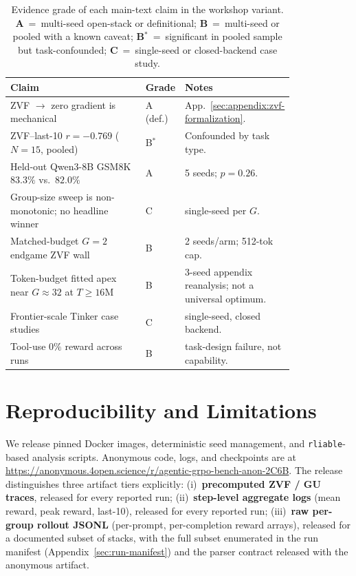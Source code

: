 \documentclass{article}
\begin{document}
\begin{table}[htbp]
\centering\small
\setlength{\tabcolsep}{4pt}
\caption{Evidence grade of each main-text claim in the workshop variant.
\textbf{A}~=~multi-seed open-stack or definitional;
\textbf{B}~=~multi-seed or pooled with a known caveat;
\textbf{B$^{*}$}~=~significant in pooled sample but task-confounded;
\textbf{C}~=~single-seed or closed-backend case study.}
\label{tab:evidence-grade}
\begin{tabular}{@{}p{0.50\linewidth} l p{0.32\linewidth}@{}}
\toprule
\textbf{Claim} & \textbf{Grade} & \textbf{Notes} \\
\midrule
ZVF $\to$ zero gradient is mechanical & A (def.) & App.~\ref{sec:appendix:zvf-formalization}. \\
ZVF--last-10 $r{=}-0.769$ ($N{=}15$, pooled) & B$^{*}$ & Confounded by task type. \\
Held-out Qwen3-8B GSM8K $83.3\%$ vs.\ $82.0\%$ & A & 5 seeds; $p{=}0.26$. \\
Group-size sweep is non-monotonic; no headline winner & C & single-seed per $G$. \\
Matched-budget $G{=}2$ endgame ZVF wall & B & 2 seeds/arm; 512-tok cap. \\
Token-budget fitted apex near $G{\approx}32$ at $T{\ge}16$M & B &
3-seed appendix reanalysis; not a universal optimum. \\
Frontier-scale Tinker case studies & C & single-seed, closed backend. \\
Tool-use $0\%$ reward across runs & B & task-design failure, not capability. \\
\bottomrule
\end{tabular}
\end{table}

\section{Reproducibility and Limitations}
\label{sec:limitations}

We release pinned Docker images, deterministic seed management, and
\texttt{rliable}-based analysis scripts. Anonymous code, logs, and
checkpoints are at
\url{https://anonymous.4open.science/r/agentic-grpo-bench-anon-2C6B}.
The release distinguishes three artifact tiers explicitly:
(i)~\textbf{precomputed ZVF / GU traces}, released for every reported run;
(ii)~\textbf{step-level aggregate logs} (mean reward, peak reward,
last-10), released for every reported run;
(iii)~\textbf{raw per-group rollout JSONL} (per-prompt, per-completion
reward arrays), released for a documented subset of stacks, with the full
subset enumerated in the run manifest (Appendix~\ref{sec:run-manifest})
and the parser contract released with the anonymous artifact.
\end{document}
